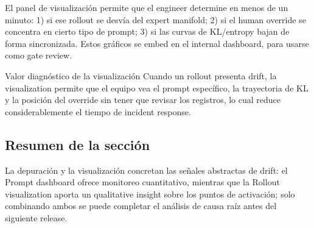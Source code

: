 El panel de visualización permite que el engineer determine en menos de un minuto: 1) si ese rollout se desvía del expert manifold; 2) si el human override se concentra en cierto tipo de prompt; 3) si las curvas de KL/entropy bajan de forma sincronizada. Estos gráficos se embed en el internal dashboard, para usarse como gate review.

\begin{knowledgebox}{Valor diagnóstico de la visualización}
Cuando un rollout presenta drift, la visualization permite que el equipo vea el prompt específico, la trayectoria de KL y la posición del override sin tener que revisar los registros, lo cual reduce considerablemente el tiempo de incident response.
\end{knowledgebox}

\subsection{Resumen de la sección}

La depuración y la visualización concretan las señales abstractas de drift: el Prompt dashboard ofrece monitoreo cuantitativo, mientras que la Rollout visualization aporta un qualitative insight sobre los puntos de activación; solo combinando ambos se puede completar el análisis de causa raíz antes del siguiente release.
